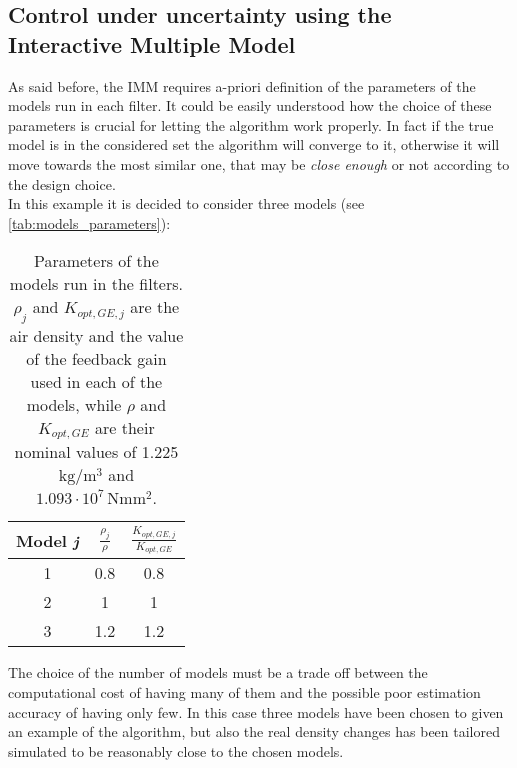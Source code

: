 \subsection{Control under uncertainty using the Interactive Multiple Model}
As said before, the IMM requires a-priori definition of the parameters of the models run in each filter. It could be easily understood how the choice of these parameters is crucial for letting the algorithm work properly. In fact if the true model is in the considered set the algorithm will converge to it, otherwise it will move towards the most similar one, that may be \textit{close enough} or not according to the design choice.\\
In this example it is decided to consider three models (see \autoref{tab:models_parameters}):
\begin{table}
  \centering
  \caption{Parameters of the models run in the filters. $\rho_j$ and $K_{opt,GE,j}$ are the air density and the value of the feedback gain used in each of the models, while $\rho$ and $K_{opt,GE}$ are their nominal values of 1.225 $\si{\kilo\gram\per\cubic\meter}$ and $1.093\cdot10^{7} \, \si{\newton\meter\square\meter}$.}
  \begin{tabular}{ccc}
    \toprule
    Model \textit{j} & $\frac{\rho_j}{\rho}$ & $\frac{K_{opt,GE,j}}{K_{opt,GE}}$  \\
    \midrule
    1 & 0.8 & 0.8\\
    2 & 1 & 1\\
    3 & 1.2 & 1.2\\
    \bottomrule
  \end{tabular}
  \label{tab:models_parameters}
\end{table}
The choice of the number of models must be a trade off between the computational cost of having many of them and the possible poor estimation accuracy of having only few. In this case three models have been chosen to given an example of the algorithm, but also the real density changes has been tailored simulated to be reasonably close to the chosen models.  

